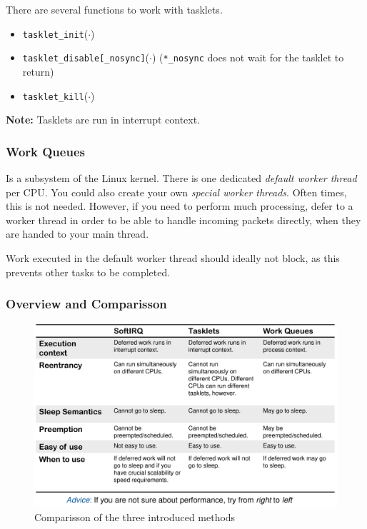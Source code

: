 \documentclass[english]{panikzettel}
\newcommand{\fkt}[1]{\texttt{#1}(\(\cdot\))}
\begin{document}
	There are several functions to work with tasklets.
	\begin{itemize}
		\item \fkt{tasklet\_init} 
		\item \fkt{tasklet\_disable[\_nosync]} (\texttt{*\_nosync} does not wait for the tasklet to return) 
		\item \fkt{tasklet\_kill}
	\end{itemize}
	
	\textbf{Note:} Tasklets are run in interrupt context.

	\subsubsection{Work Queues}
	\label{sss-work-queues}
	
	Is a subsystem of the Linux kernel. There is one dedicated \textit{default worker thread} per CPU.
	You could also create your own \textit{special worker threads}. 
	Often times, this is not needed.
	However, if you need to perform much processing, defer to a worker thread in order to be able to handle incoming packets directly, when they are handed to your main thread.

	Work executed in the default worker thread should ideally not block, as this prevents other tasks to be completed.

	\subsubsection{Overview and Comparisson}
	\label{sss-overview}
	
	\begin{figure}[H]
		\centering
		\includegraphics[width=\textwidth]{img/3-softirq-vs-rest.png}
		\caption{Comparisson of the three introduced methods}
		\label{img-3-softirq-vs-rest}
	\end{figure}
\end{document}
